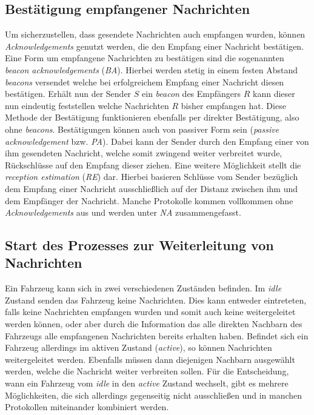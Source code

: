 \documentclass[english,runningheads,a4paper]{llncs}[2018/03/10]
\begin{document}
\subsection{Bestätigung empfangener Nachrichten}
Um sicherzustellen, dass gesendete Nachrichten auch empfangen wurden, können \textit{Acknowledgements} genutzt werden, die den Empfang einer Nachricht bestätigen.
Eine Form um empfangene Nachrichten zu bestätigen sind die sogenannten \textit{beacon acknowledgements} (\textit{BA}).
Hierbei werden stetig in einem festen Abstand \textit{beacons} versendet welche bei erfolgreichem Empfang einer Nachricht diesen bestätigen.
Erhält nun der Sender $S$ ein \textit{beacon} des Empfängers $R$ kann dieser nun eindeutig feststellen welche Nachrichten $R$ bisher empfangen hat.
Diese Methode der Bestätigung funktionieren ebenfalls per direkter Bestätigung, also ohne \textit{beacons}.
Bestätigungen können auch von passiver Form sein (\textit{passive acknowledgement} bzw. \textit{PA}).
Dabei kann der Sender durch den Empfang einer von ihm gesendeten Nachricht, welche somit zwingend weiter verbreitet wurde, Rückschlüsse auf den Empfang dieser ziehen.
Eine weitere Möglichkeit stellt die \textit{reception estimation} (\textit{RE}) dar.
Hierbei basieren Schlüsse vom Sender bezüglich dem Empfang einer Nachricht ausschließlich auf der Distanz zwischen ihm und dem Empfänger der Nachricht.
Manche Protokolle kommen vollkommen ohne \textit{Acknowledgements} aus und werden unter \textit{NA} zusammengefasst\cite{conti2013mobile}.

\subsection{Start des Prozesses zur Weiterleitung von Nachrichten}\label{subsec:forwarder-selection}
Ein Fahrzeug kann sich in zwei verschiedenen Zuständen befinden.
Im \textit{idle} Zustand senden das Fahrzeug keine Nachrichten.
Dies kann entweder eintreteten, falls keine Nachrichten empfangen wurden und somit auch keine weitergeleitet werden können, oder aber durch die Information das alle direkten Nachbarn des Fahrzeugs alle empfangenen Nachrichten bereits erhalten haben.
Befindet sich ein Fahrzeug allerdings im aktiven Zustand (\textit{active}), so können Nachrichten weitergeleitet werden.
Ebenfalls müssen dann diejenigen Nachbarn ausgewählt werden, welche die Nachricht weiter verbreiten sollen.
Für die Entscheidung, wann ein Fahrzeug vom \textit{idle} in den \textit{active} Zustand wechselt, gibt es mehrere Möglichkeiten, die sich allerdings gegenseitig nicht ausschließen und in manchen Protokollen miteinander kombiniert werden.
\end{document}
